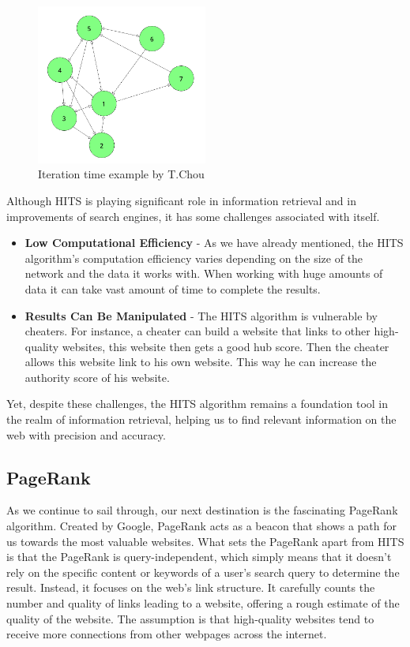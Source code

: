 \documentclass[10pt,english,a4paper]{article}
\begin{document}
\begin{figure}[h]
  \centering
  \includegraphics[width=0.5\textwidth]{comp_time_1.png}
  \caption{Iteration time example by T.Chou\cite{hits_article}}
  \label{comp_time}
\end{figure}

Although HITS is playing significant role in information retrieval and in improvements of search engines, it has some challenges associated with itself.
\begin{itemize}
  \item \textbf{Low Computational Efficiency} - As we have already mentioned, the HITS algorithm's computation efficiency varies depending on the size of the network and the data it works with. When working with huge amounts of data it can take vast amount of time to complete the results.
  \item \textbf{Results Can Be Manipulated} - The HITS algorithm is vulnerable by cheaters. For instance, a cheater can build a website that links to other high-quality websites, this website then gets a good hub score. Then the cheater allows this website link to his own website. This way he can increase the authority score of his website.  
\end{itemize}
Yet, despite these challenges, the HITS algorithm remains a foundation tool in the realm of information retrieval, helping us to find relevant information on the web with precision and accuracy.\cite{hits_challenges_article}
\subsection{PageRank}\label{pagerank}
As we continue to sail through, our next destination is the fascinating PageRank algorithm. Created by Google, PageRank acts as a beacon that shows a path for us towards the most valuable websites. What sets the PageRank apart from HITS is that the PageRank is query-independent, which simply means that it doesn't rely on the specific content or keywords of a user's search query to determine the result. Instead, it focuses on the web's link structure. It carefully counts the number and quality of links leading to a website, offering a rough estimate of the quality of the website. The assumption is that high-quality websites tend to receive more connections from other webpages across the internet.
\end{document}

